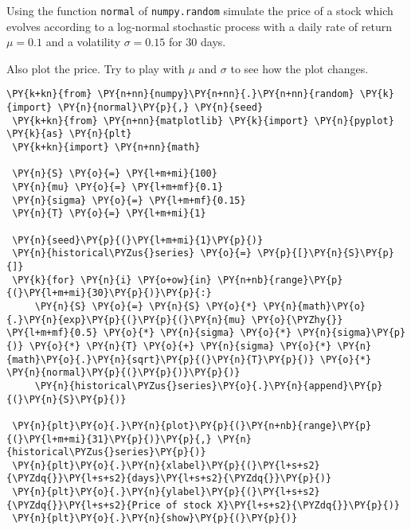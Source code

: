 \begin{Exercise}[title={(Analytic bootstrapping)}]
Using the function \texttt{normal} of \texttt{numpy.random} simulate the
price of a stock which evolves according to a log-normal stochastic
process with a daily rate of return \(\mu=0.1\) and a volatility
\(\sigma=0.15\) for 30 days.

Also plot the price. Try to play with \(\mu\) and \(\sigma\) to see how
the plot changes.
\end{Exercise}
\begin{Answer}
\begin{tcolorbox}[size=fbox, boxrule=1pt, colback=cellbackground, colframe=cellborder]
\begin{Verbatim}[commandchars=\\\{\}]
\PY{k+kn}{from} \PY{n+nn}{numpy}\PY{n+nn}{.}\PY{n+nn}{random} \PY{k}{import} \PY{n}{normal}\PY{p}{,} \PY{n}{seed}
 \PY{k+kn}{from} \PY{n+nn}{matplotlib} \PY{k}{import} \PY{n}{pyplot} \PY{k}{as} \PY{n}{plt}
 \PY{k+kn}{import} \PY{n+nn}{math}
 
 \PY{n}{S} \PY{o}{=} \PY{l+m+mi}{100}
 \PY{n}{mu} \PY{o}{=} \PY{l+m+mf}{0.1}
 \PY{n}{sigma} \PY{o}{=} \PY{l+m+mf}{0.15}
 \PY{n}{T} \PY{o}{=} \PY{l+m+mi}{1}
 
 \PY{n}{seed}\PY{p}{(}\PY{l+m+mi}{1}\PY{p}{)}
 \PY{n}{historical\PYZus{}series} \PY{o}{=} \PY{p}{[}\PY{n}{S}\PY{p}{]}
 \PY{k}{for} \PY{n}{i} \PY{o+ow}{in} \PY{n+nb}{range}\PY{p}{(}\PY{l+m+mi}{30}\PY{p}{)}\PY{p}{:}
     \PY{n}{S} \PY{o}{=} \PY{n}{S} \PY{o}{*} \PY{n}{math}\PY{o}{.}\PY{n}{exp}\PY{p}{(}\PY{p}{(}\PY{n}{mu} \PY{o}{\PYZhy{}} \PY{l+m+mf}{0.5} \PY{o}{*} \PY{n}{sigma} \PY{o}{*} \PY{n}{sigma}\PY{p}{)} \PY{o}{*} \PY{n}{T} \PY{o}{+} \PY{n}{sigma} \PY{o}{*} \PY{n}{math}\PY{o}{.}\PY{n}{sqrt}\PY{p}{(}\PY{n}{T}\PY{p}{)} \PY{o}{*} \PY{n}{normal}\PY{p}{(}\PY{p}{)}\PY{p}{)}
     \PY{n}{historical\PYZus{}series}\PY{o}{.}\PY{n}{append}\PY{p}{(}\PY{n}{S}\PY{p}{)}
     
 \PY{n}{plt}\PY{o}{.}\PY{n}{plot}\PY{p}{(}\PY{n+nb}{range}\PY{p}{(}\PY{l+m+mi}{31}\PY{p}{)}\PY{p}{,} \PY{n}{historical\PYZus{}series}\PY{p}{)}
 \PY{n}{plt}\PY{o}{.}\PY{n}{xlabel}\PY{p}{(}\PY{l+s+s2}{\PYZdq{}}\PY{l+s+s2}{days}\PY{l+s+s2}{\PYZdq{}}\PY{p}{)}
 \PY{n}{plt}\PY{o}{.}\PY{n}{ylabel}\PY{p}{(}\PY{l+s+s2}{\PYZdq{}}\PY{l+s+s2}{Price of stock X}\PY{l+s+s2}{\PYZdq{}}\PY{p}{)}
 \PY{n}{plt}\PY{o}{.}\PY{n}{show}\PY{p}{(}\PY{p}{)}
\end{Verbatim}
\end{tcolorbox}

\begin{center}
\end{center}
{ \hspace*{\fill} \\}
\end{Answer}

